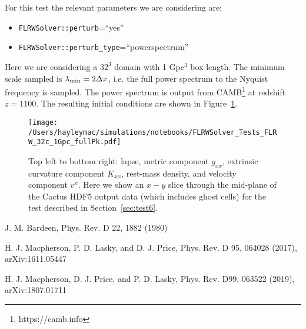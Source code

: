 For this test the relevant parameters we are considering are:

\begin{itemize}
	\item \texttt{FLRWSolver::perturb}=``yes''
	\item \texttt{FLRWSolver::perturb\_type}=``powerspectrum''
\end{itemize}
Here we are considering a $32^3$ domain with 1 Gpc$^3$ box length. The minimum scale sampled is $\lambda_{\rm min} = 2 \Delta x$, i.e. the full power spectrum to the Nyquist frequency is sampled. The power spectrum is output from CAMB\footnote{https://camb.info} at redshift $z=1100$. The resulting initial conditions are shown in Figure~\ref{fig:test6}.

\begin{figure}[ht]
	\begin{center}
	   \texttt{[image: /Users/hayleymac/simulations/notebooks/FLRWSolver\_Tests\_FLRW\_32c\_1Gpc\_fullPk.pdf]}
	\end{center}
	\caption{Top left to bottom right: lapse, metric component $g_{xx}$, extrinsic curvature component $K_{xx}$, rest-mass density, and velocity component $v^x$. Here we show an $x-y$ slice through the mid-plane of the Cactus HDF5 output data (which includes ghost cells) for the test described in Section~\ref{sec:test6}.}
	\label{fig:test6}
\end{figure}



\begin{thebibliography}{9}

 J. M. Bardeen, Phys. Rev. D 22, 1882 (1980)

 H. J. Macpherson, P. D. Lasky, and D. J. Price, Phys. Rev. D 95, 064028 (2017), arXiv:1611.05447

 H. J. Macpherson, D. J. Price, and P. D. Lasky, Phys. Rev. D99, 063522 (2019), arXiv:1807.01711

\end{thebibliography}









